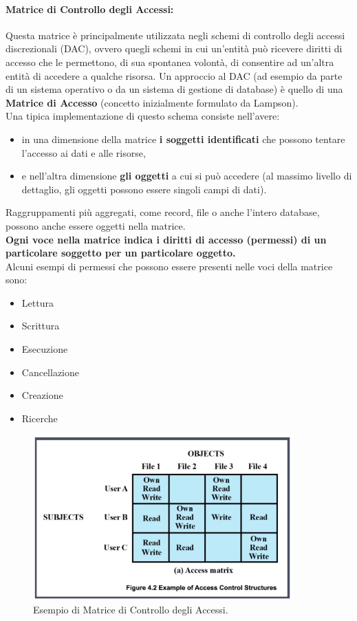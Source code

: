 \paragraph{Matrice di Controllo degli Accessi:}
Questa matrice è principalmente utilizzata negli schemi di controllo degli
accessi discrezionali (DAC), ovvero quegli schemi in cui un'entità può ricevere
diritti di accesso che le permettono, di sua spontanea volontà, di consentire ad
un'altra entità di accedere a qualche risorsa. Un approccio al DAC (ad esempio
da parte di un sistema operativo o da un sistema di gestione di database) è
quello di una \textbf{Matrice di Accesso} (concetto inizialmente formulato da
Lampson).\\
Una tipica implementazione di questo schema consiste nell'avere:
\begin{itemize}
      \item in una dimensione della matrice \textbf{i soggetti identificati} che
            possono tentare l'accesso ai dati e alle risorse,
      \item e nell'altra dimensione \textbf{gli oggetti} a cui si può accedere
            (al massimo livello di dettaglio, gli oggetti possono essere singoli campi
            di dati).
\end{itemize}
Raggruppamenti più aggregati, come record, file o anche l'intero
database, possono anche essere oggetti nella matrice.\\
\textbf{Ogni voce nella matrice indica i diritti di accesso (permessi) di un
      particolare soggetto per un particolare oggetto.}\\
Alcuni esempi di permessi che possono essere presenti nelle voci della matrice
sono:
\begin{itemize}
      \item Lettura
      \item Scrittura
      \item Esecuzione
      \item Cancellazione
      \item Creazione
      \item Ricerche
\end{itemize}

\begin{figure}[H]
      \centering
      \includegraphics[width=10cm, keepaspectratio]{capitoli/policy/imgs/matrix_access_control.png}
      \caption{Esempio di Matrice di Controllo degli Accessi.}
\end{figure}

